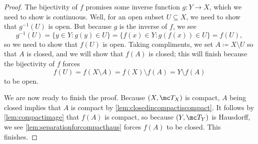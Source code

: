 \documentclass[../notes.tex]{subfiles}
\begin{document}
\begin{proof}
	The bijectivity of $f$ promises some inverse function $g\colon Y\to X$, which we need to show is continuous. Well, for an open subset $U\subseteq X$, we need to show that $g^{-1}(U)$ is open. But because $g$ is the inverse of $f$, we see
	\[g^{-1}(U)=\{y\in Y:g(y)\in U\}=\{f(x)\in Y:g(f(x))\in U\}=f(U),\]
	so we need to show that $f(U)$ is open. Taking compliments, we set $A\coloneqq X\setminus U$ so that $A$ is closed, and we will show that $f(A)$ is closed; this will finish because the bijectivity of $f$ forces
	\[f(U)=f(X\setminus A)=f(X)\setminus f(A)=Y\setminus f(A)\]
	to be open.

	We are now ready to finish the proof. Because $(X,\mc T_X)$ is compact, $A$ being closed implies that $A$ is compact by \autoref{lem:closedincompactiscompact}. It follows by \autoref{lem:compactimage} that $f(A)$ is compact, so because $(Y,\mc T_Y)$ is Hausdorff, we see \autoref{lem:separationforcompacthaus} forces $f(A)$ to be closed. This finishes.
\end{proof}
\end{document}
